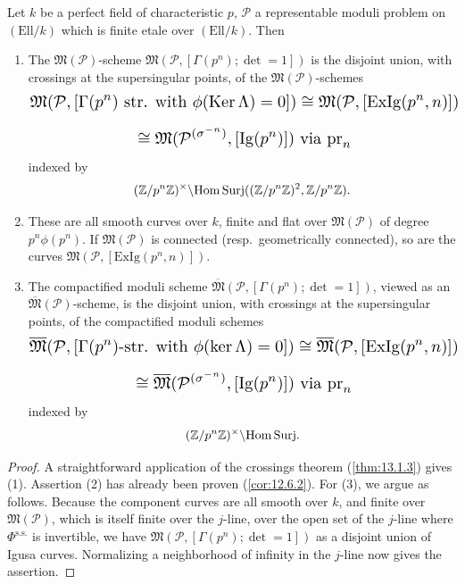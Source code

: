 \begin{kthm}\label{thm:13.7.6}
Let $k$ be a perfect field of characteristic $p$, $\mathcal{P}$ a representable moduli problem on $(\mathrm{Ell}/k)$ which is finite etale over $(\mathrm{Ell}/k)$. Then
\begin{enumerate}[label=(\arabic*), leftmargin=2.4em]
\item The $\mathfrak{M}(\mathcal{P})$-scheme $\mathfrak{M}(\mathcal{P}, [\Gamma(p^n); \det = 1])$ is the disjoint union, with crossings at the supersingular points, of the $\mathfrak{M}(\mathcal{P})$-schemes
\[
\resizebox{\linewidth}{!}{$\displaystyle
\begin{gathered}
\mathfrak{M}(\mathcal{P}, [\Gamma(p^n)\text{ str. with } \phi(\Ker \Lambda) = 0]) \cong \mathfrak{M}(\mathcal{P}, [\mathrm{ExIg}(p^n,n)]) \\[4pt]
\cong \mathfrak{M}(\mathcal{P}^{(\sigma^{-n})}, [\mathrm{Ig}(p^n)]) \text{ via } \mathrm{pr}_n
\end{gathered}$}
\]
indexed by
\[
(\mathbb{Z}/p^n\mathbb{Z})^\times \backslash \mathrm{Hom\,Surj}((\mathbb{Z}/p^n\mathbb{Z})^2, \mathbb{Z}/p^n\mathbb{Z}) .
\]
\item These are all smooth curves over $k$, finite and flat over $\mathfrak{M}(\mathcal{P})$ of degree $p^n\phi(p^n)$. If $\mathfrak{M}(\mathcal{P})$ is connected (resp.\ geometrically connected), so are the curves $\mathfrak{M}(\mathcal{P}, [\mathrm{ExIg}(p^n,n)])$.
\item The compactified moduli scheme $\overline{\mathfrak{M}}(\mathcal{P}, [\Gamma(p^n); \det = 1])$, viewed as an $\overline{\mathfrak{M}}(\mathcal{P})$-scheme, is the disjoint union, with crossings at the supersingular points, of the compactified moduli schemes
\[
\resizebox{\linewidth}{!}{$\displaystyle
\begin{gathered}
\overline{\mathfrak{M}}(\mathcal{P}, [\Gamma(p^n)\text{-str. with } \phi(\ker \Lambda) = 0]) \cong \overline{\mathfrak{M}}(\mathcal{P}, [\mathrm{ExIg}(p^n,n)]) \\[4pt]
\cong \overline{\mathfrak{M}}(\mathcal{P}^{(\sigma^{-n})}, [\mathrm{Ig}(p^n)]) \text{ via } \mathrm{pr}_n
\end{gathered}$}
\]
indexed by
\[
(\mathbb{Z}/p^n\mathbb{Z})^\times \backslash \mathrm{Hom\,Surj} .
\]
\end{enumerate}
\end{kthm}

\begin{proof}
A straightforward application of the crossings theorem (\ref{thm:13.1.3}) gives (1). Assertion (2) has already been proven (\ref{cor:12.6.2}). For (3), we argue as follows. Because the component curves are all smooth over $k$, and finite over $\mathfrak{M}(\mathcal{P})$, which is itself finite over the $j$-line, over the open set of the $j$-line where $\Phi^{\mathrm{s.s.}}$ is invertible, we have $\mathfrak{M}(\mathcal{P}, [\Gamma(p^n); \det = 1])$ as a disjoint union of Igusa curves. Normalizing a neighborhood of infinity in the $j$-line now gives the assertion.
\end{proof}

